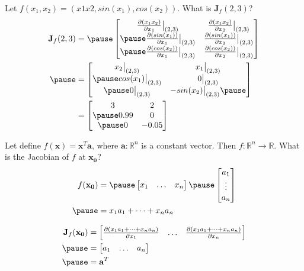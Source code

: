 \documentclass[12pt,aspectratio=169]{beamer}
\renewcommand{\Re}{\mathbb{R}}
\newcommand{\at}[2][]{#1|_{#2}}
\begin{document}
\begin{frame}
Let $f(x_1,x_2)=(x1x2,sin(x_1),cos(x_2))$. What is $\mathbf{J}_f(2,3)$?\pause
\[
\begin{aligned}
\mathbf{J}_f(2,3)&=\pause
\begin{bmatrix}
\frac{\partial (x_1x_2)}{\partial x_1}\at[\big]{(2,3)} & \frac{\partial (x_1x_2)}{\partial x_2}\at[\big]{(2,3)}\\ \pause
\frac{\partial (sin(x_1))}{\partial x_1}\at[\big]{(2,3)} & \frac{\partial (sin(x_1))}{\partial x_2}\at[\big]{(2,3)}\\ \pause
\frac{\partial (cos(x_2))}{\partial x_1}\at[\big]{(2,3)} & \frac{\partial (cos(x_2))}{\partial x_2}\at[\big]{(2,3)}
\end{bmatrix}\\ \pause
&=\begin{bmatrix}
x_2\at[\big]{(2,3)} & x_1\at[\big]{(2,3)}\\ \pause
cos(x_1)\at[\big]{(2,3)} & 0\at[\big]{(2,3)}\\ \pause
0\at[\big]{(2,3)} & -sin(x_2)\at[\big]{(2,3)} \pause
\end{bmatrix}\\
&=\begin{bmatrix}
3 & 2\\ \pause
0.99 & 0\\ \pause
0 & -0.05
\end{bmatrix}
\end{aligned}
\]
\end{frame}


\begin{frame}
Let define $f(\mathbf{x})=\mathbf{x}^T\mathbf{a}$, where $\mathbf{a}:\Re^n$ is a constant vector. Then $f:\Re^n\to \Re$. What is the Jacobian of $f$ at $\mathbf{x_0}$? \pause
\[
\begin{aligned}
f(\mathbf{x_0})&=\pause
\begin{bmatrix}
x_1 & \dots & x_n
\end{bmatrix}\pause
\begin{bmatrix}
a_1 \\
\vdots\\
a_n
\end{bmatrix}\\ \pause
&=x_1a_1+\dots +x_na_n
\end{aligned}
\]
\end{frame}


\begin{frame}
\[
\begin{aligned}
\mathbf{J}_f(\mathbf{x_0})&=
\begin{bmatrix}
\frac{\partial (x_1a_1+\dots + x_na_n)}{\partial x_1} & \dots & \frac{\partial (x_1a_1+\dots + x_na_n)}{\partial x_n}\\ 
\end{bmatrix}\\ \pause
&=\begin{bmatrix}
a_1 & \dots & a_n
\end{bmatrix}\\ \pause
&=\mathbf{a}^T
\end{aligned}
\]
\end{frame}
\end{document}
